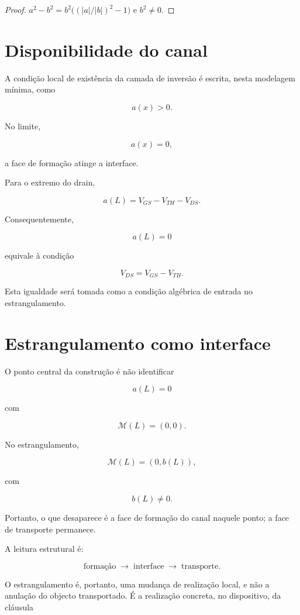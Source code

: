 \documentclass[11pt,a4paper]{article}
\begin{document}
\begin{proof}
\(a^{2}-b^{2}=b^{2}\bigl((\lvert a\rvert/\lvert b\rvert)^{2}-1\bigr)\) e
\(b^{2}\neq0\).
\end{proof}


\section{Disponibilidade do canal}

A condição local de existência da camada de inversão é escrita,
nesta modelagem mínima, como

\[
a(x)>0.
\]

No limite,

\[
a(x)=0,
\]

a face de formação atinge a interface.

Para o extremo do drain,

\[
a(L)=V_{GS}-V_{TH}-V_{DS}.
\]

Consequentemente,

\[
a(L)=0
\]

equivale à condição

\[
\boxed{
V_{DS}=V_{GS}-V_{TH}.
}
\]

Esta igualdade será tomada como a condição algébrica de entrada
no estrangulamento.


\section{Estrangulamento como interface}
\label{sec:interface}

O ponto central da construção é não identificar

\[
a(L)=0
\]

com

\[
\mathcal M(L)=(0,0).
\]

No estrangulamento,

\[
\boxed{
\mathcal M(L)=(0,b(L)),
}
\]

com

\[
b(L)\neq0.
\]

Portanto, o que desaparece é a face de formação do canal naquele
ponto; a face de transporte permanece.

A leitura estrutural é:

\[
\boxed{
\text{formação}\;\longrightarrow\;
\text{interface}\;\longrightarrow\;
\text{transporte}.
}
\]

O estrangulamento é, portanto, uma mudança de realização local,
e não a anulação do objecto transportado. É a realização concreta,
no dispositivo, da cláusula
\end{document}

